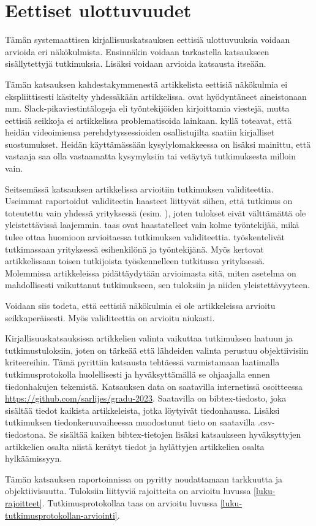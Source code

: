 \documentclass[utf8]{gradu3}
\begin{document}
\section{Eettiset ulottuvuudet}

Tämän systemaattisen kirjallisuuskatsauksen eettisiä ulottuvuuksia voidaan arvioida eri näkökulmista. Ensinnäkin voidaan tarkastella katsaukseen sisällytettyjä tutkimuksia. Lisäksi voidaan arvioida katsausta itseään.

Tämän katsauksen kahdestakymmenestä artikkelista eettisiä näkökulmia ei ekspliittisesti käsitelty yhdessäkään artikkelissa. \textcite{moe-ym-2020} ovat hyödyntäneet aineistonaan mm. Slack-pikaviestintälogeja eli työntekijöiden kirjoittamia viestejä, mutta eettisiä seikkoja ei artikkelissa problematisoida lainkaan. \textcite{yates-ym-2020} kyllä toteavat, että heidän videoimiensa perehdytyssessioiden osallistujilta saatiin kirjalliset suostumukset. Heidän käyttämässään kysylylomakkeessa on lisäksi mainittu, että vastaaja saa olla vastaamatta kysymyksiin tai vetäytyä tutkimuksesta milloin vain. 

Seitsemässä katsauksen artikkelissa arvioitiin tutkimuksen validiteettia. Useimmat raportoidut validiteetin haasteet liittyvät siihen, että tutkimus on toteutettu vain yhdessä yrityksessä (esim. \textcite{johnson-senges-2010}), joten tulokset eivät välttämättä ole yleistettävissä laajemmin. \textcite{viana-ym-2014} taas ovat haastatelleet vain kolme työntekijää, mikä tulee ottaa huomioon arvioitaessa tutkimuksen validiteettia. \textcite{hemphill-begel-2011} työskentelivät tutkimassaan yrityksessä esihenkilönä ja työntekijänä. Myös \textcite{kumar-wallace-2019} kertovat artikkelissaan toisen tutkijoista työskennelleen tutkitussa yrityksessä. Molemmissa artikkeleissa pidättäydytään arvioimasta sitä, miten asetelma on mahdollisesti vaikuttanut tutkimukseen, sen tuloksiin ja niiden yleistettävyyteen.

Voidaan siis todeta, että eettisiä näkökulmia ei ole artikkeleissa arvioitu seikkaperäisesti. Myös validiteettia on arvioitu niukasti.

Kirjallisuuskatsauksissa artikkelien valinta vaikuttaa tutkimuksen laatuun ja tutkimustuloksiin, joten on tärkeää että lähdeiden valinta perustuu objektiivisiin kriteereihin. Tämä pyrittiin katsausta tehtäessä varmistamaan laatimalla tutkimusprotokolla huolellisesti ja hyväksyttämällä se ohjaajalla ennen tiedonhakujen tekemistä. Katsauksen data on saatavilla internetissä osoitteessa 
 \href{https://github.com/sarlijes/gradu-2023}{https://github.com/sarlijes/gradu-2023}. Saatavilla on bibtex-tiedosto, joka sisältää tiedot kaikista artikkeleista, jotka löytyivät tiedonhaussa. Lisäksi tutkimuksen tiedonkeruuvaiheessa muodostunut tieto on saatavilla .csv-tiedostona. Se sisältää kaiken bibtex-tietojen lisäksi katsaukseen hyväksyttyjen artikkelien osalta niistä kerätyt tiedot ja hylättyjen artikkelien osalta hylkäämissyyn. 

Tämän katsauksen raportoinnissa on pyritty noudattamaan tarkkuutta ja objektiivisuutta. Tuloksiin liittyviä rajoitteita on arvioitu luvussa \ref{luku-rajoitteet}. Tutkimusprotokollaa taas on arvioitu luvussa \ref{luku-tutkimusprotokollan-arviointi}.


\printbibliography
\end{document}
